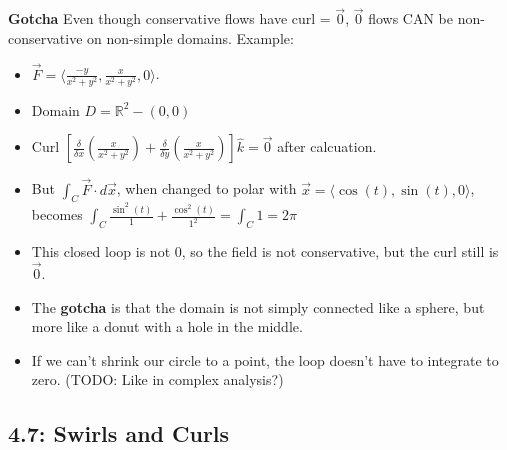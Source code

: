 \documentclass[11pt, oneside]{article}   	%
\begin{document}
\textbf{Gotcha} Even though conservative flows have curl = $\vec{0}$,  $\vec{0}$ flows CAN be non-conservative on non-simple domains.  Example: 
\begin{itemize}
\item $\vec{F} = \langle \frac{-y}{x^2+y^2}, \frac{x}{x^2+y^2}, 0 \rangle $.  
\item Domain $D = \mathbb{R}^2 - (0,0)$
\item Curl $[\frac{\delta}{\delta x}(\frac{x}{x^2+y^2}) + \frac{\delta}{\delta y}(\frac{x}{x^2+y^2})]\hat{k} = \vec{0}$ after calcuation.
\item But $\int_C \vec{F}\cdot d\vec{x}$, when changed to polar with $\vec{x} = \langle \cos(t), \sin(t), 0\rangle$, becomes $\int_C \frac{\sin^2(t)}{1} + \frac{\cos^2(t)}{1^2} = \int_C 1 = 2\pi$
\item This closed loop is not 0, so the field is not conservative, but the curl still is $\vec{0}$.
\item The \textbf{gotcha} is that the domain is not simply connected like a sphere, but more like a donut with a hole in the middle.
\item If we can't shrink our circle to a point, the loop doesn't have to integrate to zero.  (TODO: Like in complex analysis?)
\end{itemize}

\subsection{4.7: Swirls and Curls}
\end{document}
